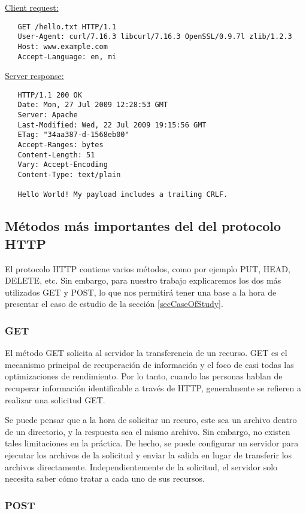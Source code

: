 \bigskip
\noindent
\underline{Client request:}
\begin{verbatim}
   GET /hello.txt HTTP/1.1
   User-Agent: curl/7.16.3 libcurl/7.16.3 OpenSSL/0.9.7l zlib/1.2.3
   Host: www.example.com
   Accept-Language: en, mi
  \end{verbatim}
\underline{Server response:}
\begin{verbatim}
   HTTP/1.1 200 OK
   Date: Mon, 27 Jul 2009 12:28:53 GMT
   Server: Apache
   Last-Modified: Wed, 22 Jul 2009 19:15:56 GMT
   ETag: "34aa387-d-1568eb00"
   Accept-Ranges: bytes
   Content-Length: 51
   Vary: Accept-Encoding
   Content-Type: text/plain

   Hello World! My payload includes a trailing CRLF.
\end{verbatim}


\subsection{Métodos más importantes del del protocolo HTTP}

El protocolo HTTP contiene varios métodos, como por ejemplo PUT, HEAD, DELETE, etc. Sin
embargo, para nuestro trabajo explicaremos los dos más utilizados GET y POST, lo que
nos permitirá tener una base a la hora de presentar el caso de estudio de la 
sección \ref{secCaseOfStudy}.


\subsubsection*{GET}

El método GET solicita al servidor la transferencia de un recurso.
GET es el mecanismo principal de recuperación de información y el 
foco de casi todas las optimizaciones de rendimiento. Por lo tanto,
cuando las personas hablan de recuperar información identificable
a través de HTTP, generalmente se refieren a realizar una solicitud
GET.

Se puede pensar que a la hora de solicitar un recuro, este sea un archivo 
dentro de un directorio, y la respuesta sea el mismo archivo. Sin embargo, 
no existen tales limitaciones en la práctica. De hecho, se puede 
configurar un servidor para ejecutar los archivos de la solicitud y 
enviar la salida en lugar de transferir los archivos directamente. 
Independientemente de la solicitud, el servidor solo necesita saber 
cómo tratar a cada uno de sus recursos.

\subsubsection*{POST}

